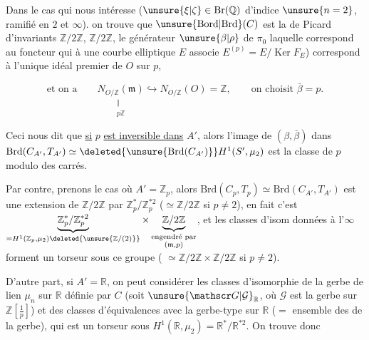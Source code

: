 
Dans le cas qui nous intéresse ($\unsure{\xi|\zeta}\in\mathrm{Br}(\mathbb Q)$
d'indice $\unsure{n=2}$, ramifié  en $2$ et $\infty$). 
on trouve que $\unsure{\mathrm{Bord}|\mathrm{Brd}}(C)$ est la  de Picard
 d'invariants $\mathbb Z/2\mathbb Z$, $\mathbb Z/2\mathbb Z$, le générateur
$\unsure{\beta|\rho}$ de $\pi_0$ laquelle correspond au  foncteur
qui à une courbe elliptique $E$ associe $E^{(p)}=E/\operatorname{Ker} F_E$)
correspond à l'unique idéal premier  de $O$ sur $p$,

\[
\text{et on a}\qquad \underset{\substack{\Vert\\p\mathbb Z}}{N_{O/\mathbb Z}(\mathfrak m)}
\hookrightarrow N_{O/\mathbb Z}(O)=\mathbb Z,\qquad \text{on choisit }\bar\beta=p.
\]

Ceci nous dit que \uline{si} $p$ \uline{est inversible dans} $A'$, alors
l'image de $(\beta,\bar\beta)$ dans $\mathrm{Brd}(C_{A'},T_{A'})\simeq\deleted{\unsure{\mathrm{Brd}(C_{A'})}}H^1(S',\mu_2)$
est la classe de $p$ modulo des carrés.

Par contre, prenons le cas où $A'=\mathbb Z_p$, alors
$\mathrm{Brd}(C_p,T_p)\simeq\mathrm{Brd}(C_{A'},T_{A'})$ est une extension de $\mathbb Z/2\mathbb Z$ par
$\mathbb Z_p^*/\mathbb Z_p^{*2}$ ($\simeq\mathbb Z/2\mathbb Z$ si $p\ne2$), en fait c'est
$\underbrace{\mathbb Z_p^*/\mathbb Z_p^{*2}}_{=H^1(\mathbb Z_p,\mu_2)\deleted{\unsure{\mathbb Z/(2)}}}\times
\underbrace{\mathbb Z/2\mathbb Z}_{\substack{\text{engendré par}\\(\mathfrak m,p)}}$, et les
classes d'isom  données à l'$\infty$  forment un torseur
sous ce groupe ( $\simeq\mathbb Z/2\mathbb Z\times\mathbb Z/2\mathbb Z$ si $p\ne2$).

D'autre part, si $A'=\mathbb R$, on peut considérer les classes d'isomorphie de la gerbe de lien $\mu_n$ sur $\mathbb R$ définie par $C$
(soit $\unsure{\mathscr G|\mathcal G}_{\mathbb R}$, où $\mathscr G$ est la gerbe sur $\mathbb Z[\frac1p]$) et  des
classes d'équivalences avec la gerbe-type sur $\mathbb R$
($=$ ensemble des  de la gerbe), qui est un
torseur sous $H^1(\mathbb R,\mu_2)=\mathbb R^*/\mathbb R^{*2}$. On trouve donc
